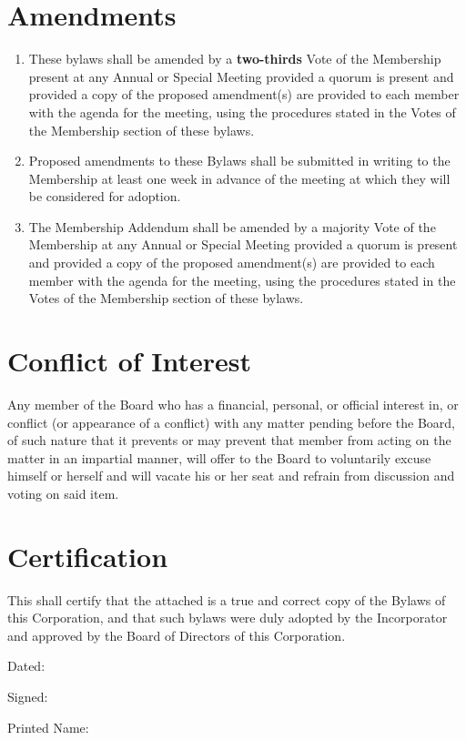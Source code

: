\documentclass{article}
\begin{document}
\section{Amendments}
\begin{enumerate}
	\item These bylaws shall be amended by a \textbf{two-thirds} Vote of the Membership present at 
	any Annual or Special Meeting provided a quorum is present and provided a copy 
	of the proposed amendment(s) are provided to each member with the agenda for the 
	meeting, using the procedures stated in the Votes of the Membership section of these 
	bylaws.
	\item Proposed amendments to these Bylaws shall be submitted in writing to the 
	Membership at least one week in advance of the meeting at which they will be considered 
	for adoption.
	\item The Membership Addendum shall be amended by a majority Vote of the Membership at any Annual or Special Meeting provided a quorum is present and provided a copy of the proposed amendment(s) are provided to each member with the agenda for the meeting, using the procedures stated in the Votes of the Membership section of these bylaws.
\end{enumerate}
\section{Conflict of Interest}
Any member of the Board who has a financial, personal, or official interest in, or conflict 
(or appearance of a conflict) with any matter pending before the Board, of such nature that it 
prevents or may prevent that member from acting on the matter in an impartial manner, 
will offer to the Board to voluntarily excuse himself or herself and will vacate his or her seat 
and refrain from discussion and voting on said item.
\section{Certification}
This shall certify that the attached is a true and correct copy of the Bylaws of this 
Corporation, and that such bylaws were duly adopted by the Incorporator and approved by 
the Board of Directors of this Corporation.

Dated:

Signed:

Printed Name:
\end{document}
